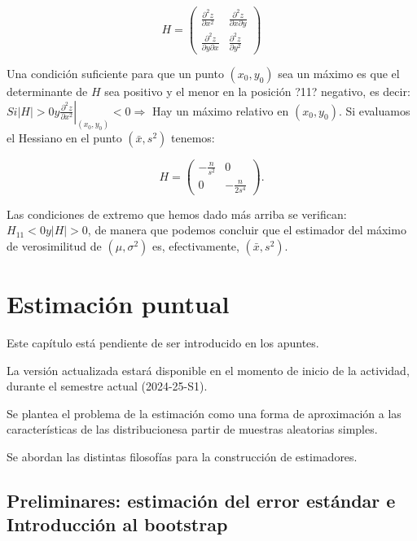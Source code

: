 \documentclass[
]{article}
\begin{document}
\[
H=\left(\begin{array}{cc}
\frac{\partial^{2} z}{\partial x^{2}} & \frac{\partial^{2} z}{\partial x \partial y} \\
\frac{\partial^{2} z}{\partial y \partial x} & \frac{\partial^{2} z}{\partial y^{2}}
\end{array}\right)
\]

Una condición suficiente para que un punto \(\left(x_{0}, y_{0}\right)\) sea un máximo es que el determinante de \(H\) sea positivo y el menor en la posición ?11? negativo, es decir:
\(S i|H|>\left.0 y \frac{\partial^{2} z}{\partial x^{2}}\right|_{\left(x_{0}, y_{0}\right)}<0 \Longrightarrow\) Hay un máximo relativo en \(\left(x_{0}, y_{0}\right)\).
Si evaluamos el Hessiano en el punto \(\left(\bar{x}, s^{2}\right)\) tenemos:

\[
H=\left(\begin{array}{cc}
-\frac{n}{s^{2}} & 0 \\
0 & -\frac{n}{2 s^{4}}
\end{array}\right) .
\]

Las condiciones de extremo que hemos dado más arriba se verifican: \(H_{11}<0 y|H|>0\), de manera que podemos concluir que el estimador del máximo de verosimilitud de \(\left(\mu, \sigma^{2}\right)\) es, efectivamente, \(\left(\bar{x}, s^{2}\right)\).

\section{Estimación puntual}\label{estimaciuxf3n-puntual-1}

Este capítulo está pendiente de ser introducido en los apuntes.

La versión actualizada estará disponible en el momento de inicio de la actividad, durante el semestre actual (2024-25-S1).

Se plantea el problema de la estimación como una forma de aproximación a las características de las distribucionesa partir de muestras aleatorias simples.

Se abordan las distintas filosofías para la construcción de estimadores.

\subsection{Preliminares: estimación del error estándar e Introducción al bootstrap}\label{preliminares-estimaciuxf3n-del-error-estuxe1ndar-e-introducciuxf3n-al-bootstrap}
\end{document}
